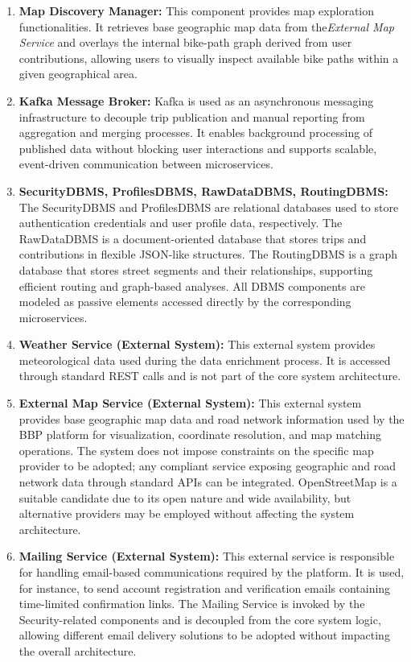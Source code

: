 \begin{enumerate}
    \item \textbf{Map Discovery Manager:}  
    This component provides map exploration functionalities. It retrieves base geographic map data from the\textit{External Map Service} and overlays the internal bike-path graph derived from user contributions, allowing users to visually inspect available bike paths within a given geographical area.

    \item \textbf{Kafka Message Broker:}  
    Kafka is used as an asynchronous messaging infrastructure to decouple trip publication and manual reporting from aggregation and merging processes. It enables background processing of published data without blocking user interactions and supports scalable, event-driven communication between microservices.

    \item \textbf{SecurityDBMS, ProfilesDBMS, RawDataDBMS, RoutingDBMS:}  
    The SecurityDBMS and ProfilesDBMS are relational databases used to store authentication credentials and user profile data, respectively. The RawDataDBMS is a document-oriented database that stores trips and contributions in flexible JSON-like structures. The RoutingDBMS is a graph database that stores street segments and their relationships, supporting efficient routing and graph-based analyses. All DBMS components are modeled as passive elements accessed directly by the corresponding microservices.

    \item \textbf{Weather Service (External System):}  
    This external system provides meteorological data used during the data enrichment process. It is accessed through standard REST calls and is not part of the core system architecture.

    \item \textbf{External Map Service (External System):}  
    This external system provides base geographic map data and road network information used by the BBP platform for visualization, coordinate resolution, and map matching operations. The system does not impose constraints on the specific map provider to be adopted; any compliant service exposing geographic and road network data through standard APIs can be integrated. OpenStreetMap is a suitable candidate due to its open nature and wide availability, but alternative providers may be employed without affecting the system architecture.

    \item \textbf{Mailing Service (External System):}  
    This external service is responsible for handling email-based communications required by the platform. It is used, for instance, to send account registration and verification emails containing time-limited confirmation links. The Mailing Service is invoked by the Security-related components and is decoupled from the core system logic, allowing different email delivery solutions to be adopted without impacting the overall architecture.


\end{enumerate}


